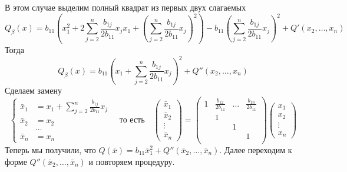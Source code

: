 В этом случае выделим полный квадрат из первых двух слагаемых
\[
Q_\beta(x) = b_{11}\left(x_1^2 + 2 \sum_{j=2}^n \frac{b_{1j}}{2 b_{11}}x_j x_1 + \left(\sum_{j=2}^n \frac{b_{1j}}{2 b_{11}}x_j \right)^2\right) - b_{11}\left(\sum_{j=2}^n \frac{b_{1j}}{2 b_{11}}x_j\right)^2 + Q'(x_2,\ldots,x_n)
\]
Тогда
\[
Q_\beta(x) = b_{11}\left(x_1 + \sum_{j=2}^n \frac{b_{1j}}{2 b_{11}}x_j \right)^2 + Q''(x_2,\ldots,x_n)
\]
Сделаем замену
\[
\left\{
\begin{aligned}
\bar x_1 &= x_1 + \sum_{j=2}^n \frac{b_{1j}}{2 b_{11}}x_j \\
\bar x_2 &= x_2\\
&\ldots\\
\bar x_n &= x_n
\end{aligned}
\right.
\quad\text{то есть}\quad
\begin{pmatrix}
{\bar x_1}\\{\bar x_2}\\{\vdots}\\{\bar x_n}
\end{pmatrix}
=
\begin{pmatrix}
{1}&{\frac{b_{12}}{2b_{11}}}&{\ldots}&{\frac{b_{1n}}{2b_{11}}}\\
{}&{1}&{}&{}\\
{}&{}&{1}&{}\\
{}&{}&{}&{1}\\
\end{pmatrix}
\begin{pmatrix}
{x_1}\\{x_2}\\{\vdots}\\{x_n}
\end{pmatrix}
\]
Теперь мы получили, что $Q(\bar x) = b_{11}\bar x_1^2 + Q''(\bar x_2,\ldots, \bar x_n)$. Далее переходим к форме $Q''(\bar x_2,\ldots, \bar x_n)$ и повторяем процедуру.

